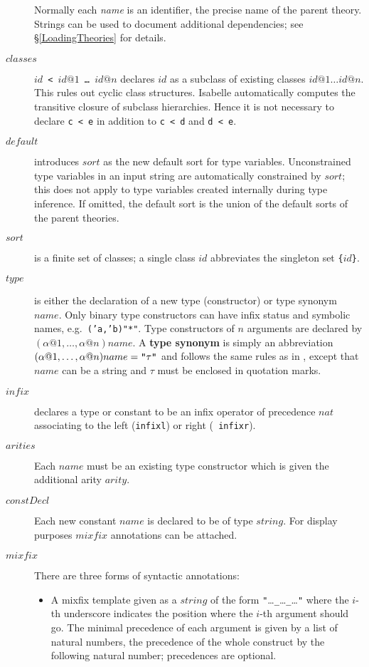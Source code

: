 \begin{description}
  Normally each {\it name\/} is an identifier, the precise name of the parent
  theory. Strings can be used to document additional dependencies; see
  \S\ref{LoadingTheories} for details.
\item[$classes$] {\tt$id$ < $id@1$ \dots\ $id@n$} declares $id$ as a subclass
  of existing classes $id@1\dots id@n$.  This rules out cyclic class
  structures.  Isabelle automatically computes the transitive closure of
  subclass hierarchies.  Hence it is not necessary to declare {\tt c < e} in
  addition to {\tt c < d} and {\tt d < e}.
\item[$default$] introduces $sort$ as the new default sort for type
  variables.  Unconstrained type variables in an input string are
  automatically constrained by $sort$; this does not apply to type variables
  created internally during type inference.  If omitted, the default sort is
  the union of the default sorts of the parent theories.
\item[$sort$] is a finite set of classes; a single class $id$ abbreviates the
  singleton set {\tt\{}$id${\tt\}}.
\item[$type$] is either the declaration of a new type (constructor) or type
  synonym $name$. Only binary type constructors can have infix status and
  symbolic names, e.g.\ {\tt ('a,'b)"*"}. Type constructors of $n$ arguments
  are declared by $(\alpha@1,\dots,\alpha@n)name$.  A {\bf type
    synonym} is simply an abbreviation
  $(\alpha@1,\dots,\alpha@n)name = \mbox{\tt"}\tau\mbox{\tt"}$ and follows
  the same rules as in \ML, except that $name$ can be a string and $\tau$
  must be enclosed in quotation marks.
\item[$infix$] declares a type or constant to be an infix operator of
  precedence $nat$ associating to the left ({\tt infixl}) or right ({\tt
    infixr}).
\item[$arities$] Each $name$ must be an existing type constructor which is
  given the additional arity $arity$.
\item[$constDecl$] Each new constant $name$ is declared to be of type
  $string$.  For display purposes $mixfix$ annotations can be attached.
\item[$mixfix$] There are three forms of syntactic annotations:
  \begin{itemize}
  \item A mixfix template given as a $string$ of the form
    {\tt"}\dots{\tt\_}\dots{\tt\_}\dots{\tt"} where the $i$-th underscore
    indicates the position where the $i$-th argument should go. The minimal
    precedence of each argument is given by a list of natural numbers, the
    precedence of the whole construct by the following natural number;
    precedences are optional.


\end{itemize}
\end{description}
